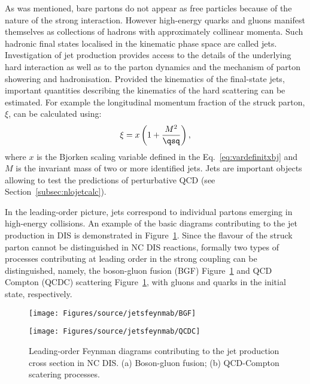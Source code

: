 As was mentioned, bare partons do not appear as free particles because of the nature of the strong interaction. However high-energy quarks and gluons manifest themselves as collections of hadrons with approximately collinear momenta. Such hadronic final states localised in the kinematic phase space are called jets. Investigation of jet production provides access to the details of the underlying hard interaction as well as to the parton dynamics and the mechanism of parton showering and hadronisation. Provided the kinematics of the final-state jets, important quantities describing the kinematics of the hard scattering can be estimated. For example the longitudinal momentum fraction of the struck parton, $\xi$, can be calculated using:
\begin{equation}
\xi = x\left(1+\frac{M^2}{\qsq}\right),
\label{eq:xidef}
\end{equation}
where $x$ is the Bjorken scaling variable defined in the Eq.~\eqref{eq:vardefinitxbj} and $M$ is the invariant mass of two or more identified jets. Jets are important objects allowing to test the predictions of perturbative QCD (see Section~\ref{subsec:nlojetcalc}).

In the leading-order picture, jets correspond to individual partons emerging in high-energy collisions. An example of the basic diagrams contributing to the jet production in DIS is demonstrated in Figure~\ref{fig:LOFeynmandiags}. Since the flavour of the struck parton cannot be distinguished in NC DIS reactions, formally two types of processes contributing at leading order in the strong coupling can be distinguished, namely, the boson-gluon fusion (BGF) Figure~\ref{fig:LOFeynmandiags} and QCD Compton (QCDC) scattering Figure~\ref{fig:LOFeynmandiags}, with gluons and quarks in the initial state, respectively.
\begin{figure}
	\centering
	\begin{subfloat}[]{
		\texttt{[image: Figures/source/jetsfeynmab/BGF]}
		\label{subfig:lobgf}
		}%
		\end{subfloat}
		\begin{subfloat}[]{
		\texttt{[image: Figures/source/jetsfeynmab/QCDC]}
		\label{subfig:loqcdc}
		}%
		\end{subfloat}
	\caption{Leading-order Feynman diagrams contributing to the jet production cross section in NC DIS. (a) Boson-gluon fusion; (b) QCD-Compton scatering processes.}
	\label{fig:LOFeynmandiags}
\end{figure}

